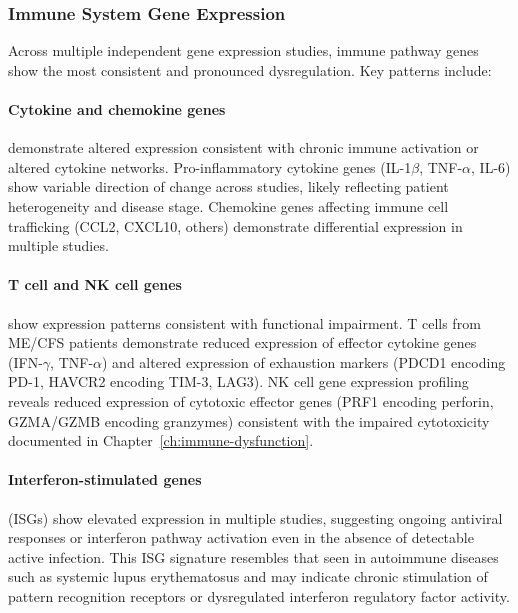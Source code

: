 \subsubsection{Immune System Gene Expression}

\begin{achievement}
\label{ach:immune-gene-dysregulation}
Across multiple independent gene expression studies, immune pathway genes show the most consistent and pronounced dysregulation. Key patterns include:

\paragraph{Cytokine and chemokine genes} demonstrate altered expression consistent with chronic immune activation or altered cytokine networks. Pro-inflammatory cytokine genes (IL-1$\beta$, TNF-$\alpha$, IL-6) show variable direction of change across studies, likely reflecting patient heterogeneity and disease stage. Chemokine genes affecting immune cell trafficking (CCL2, CXCL10, others) demonstrate differential expression in multiple studies.

\paragraph{T cell and NK cell genes} show expression patterns consistent with functional impairment. T cells from ME/CFS patients demonstrate reduced expression of effector cytokine genes (IFN-$\gamma$, TNF-$\alpha$) and altered expression of exhaustion markers (PDCD1 encoding PD-1, HAVCR2 encoding TIM-3, LAG3). NK cell gene expression profiling reveals reduced expression of cytotoxic effector genes (PRF1 encoding perforin, GZMA/GZMB encoding granzymes) consistent with the impaired cytotoxicity documented in Chapter~\ref{ch:immune-dysfunction}.

\paragraph{Interferon-stimulated genes} (ISGs) show elevated expression in multiple studies, suggesting ongoing antiviral responses or interferon pathway activation even in the absence of detectable active infection. This ISG signature resembles that seen in autoimmune diseases such as systemic lupus erythematosus and may indicate chronic stimulation of pattern recognition receptors or dysregulated interferon regulatory factor activity.
\end{achievement}

